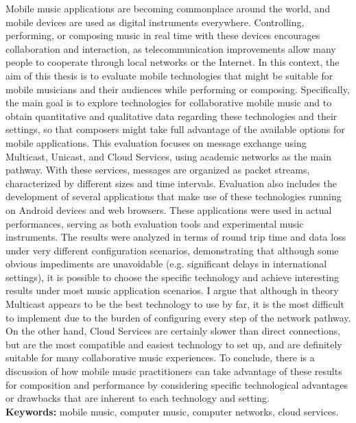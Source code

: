 \documentclass[11pt,twoside,a4paper]{book}
\begin{document}
	Mobile music applications are becoming commonplace around the world, and mobile devices are used as digital instruments everywhere.
	Controlling, performing, or composing music in real time with these devices encourages collaboration and interaction, as telecommunication improvements allow many people to cooperate through local networks or the Internet.
	In this context, the aim of this thesis is to evaluate mobile technologies that might be suitable for mobile musicians and their audiences while performing or composing.
	Specifically, the main goal is to explore technologies for collaborative mobile music and to obtain quantitative and qualitative data regarding these technologies and their settings, so that composers might take full advantage of the available options for mobile applications.
	This evaluation focuses on message exchange using Multicast, Unicast, and Cloud Services, using academic networks as the main pathway.
	With these services, messages are organized as packet streams, characterized by different sizes and time intervals.
	Evaluation also includes the development of several applications that make use of these technologies running on Android devices and web browsers. 
	These applications were used in actual performances, serving as both evaluation tools and experimental music instruments.
	The results were analyzed in terms of round trip time and data loss under very different configuration scenarios, demonstrating that although some obvious impediments are unavoidable (e.g. significant delays in international settings), it is possible to choose the specific technology and achieve interesting results under most music application scenarios.
	I argue that although in theory Multicast appears to be the best technology to use by far, it is the most difficult to implement due to the burden of configuring every step of the network pathway.
	On the other hand, Cloud Services are certainly slower than direct connections, but are the most compatible and easiest technology to set up, and are definitely suitable for many collaborative music experiences.
	To conclude, there is a discussion of how mobile music practitioners can take advantage of these results for composition and performance by considering specific technological advantages or drawbacks that are inherent to each technology and setting.
	\\
	
	\noindent \textbf{Keywords:} mobile music, computer music, computer networks, cloud services.
	
\end{document}
